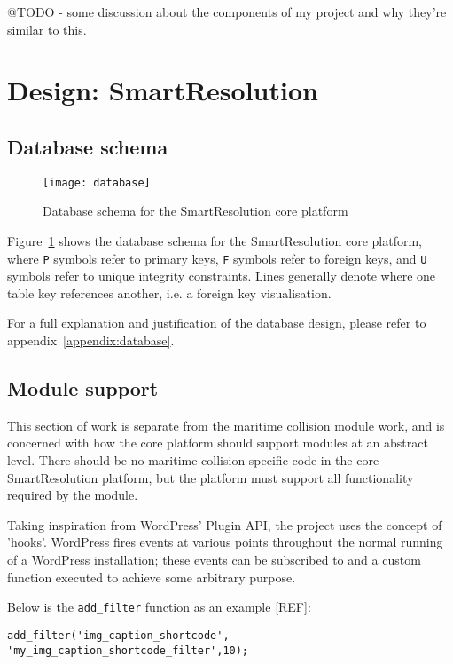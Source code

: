 @TODO - some discussion about the components of my project and why they're similar to this.

\section{Design: SmartResolution}

\subsection{Database schema}

\begin{figure}[h!]
  \centering
    \ifimages
    \texttt{[image: database]}
    \fi
  \caption{Database schema for the SmartResolution core platform}
  \label{uml:databaseSchema}
\end{figure}

Figure~\ref{uml:databaseSchema} shows the database schema for the SmartResolution core platform, where \lstinline{P} symbols refer to primary keys, \lstinline{F} symbols refer to foreign keys, and \lstinline{U} symbols refer to unique integrity constraints. Lines generally denote where one table key references another, i.e. a foreign key visualisation.

For a full explanation and justification of the database design, please refer to appendix~\ref{appendix:database}.

\subsection{Module support}

This section of work is separate from the maritime collision module work, and is concerned with how the core platform should support modules at an abstract level. There should be no maritime-collision-specific code in the core SmartResolution platform, but the platform must support all functionality required by the module.

Taking inspiration from WordPress' Plugin API, the project uses the concept of 'hooks'. WordPress fires events at various points throughout the normal running of a WordPress installation; these events can be subscribed to and a custom function executed to achieve some arbitrary purpose.

Below is the \lstinline{add_filter} function as an example [REF]: %

\begin{lstlisting}
add_filter('img_caption_shortcode', 'my_img_caption_shortcode_filter',10);
\end{lstlisting}

